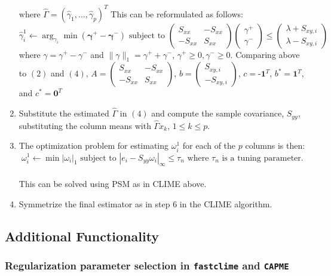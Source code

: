\documentclass{article}
\begin{document}
\begin{enumerate}
  $\text{where }\hat{\Gamma}=(\hat{\gamma}_1,...,\hat{\gamma}_p)^T$ This
  can be reformulated as follows:
  \[\hat{\gamma}_i^1\leftarrow\arg_{{\gamma}_i}\min (\mathbf{\gamma^{+}-\gamma^{-}}) \text{ subject to  } \left( \begin{array}{cc}
  S_{xx} & -S_{xx} \\
  -S_{xx} & S_{xx} \end{array} \right) 
  \left( \begin{array}{c}
  \gamma^+\\
  \gamma^-\end{array} \right)\le\left( \begin{array}{c}
  \lambda+S_{xy,i}\\
  \lambda-S_{xy,i}\end{array} \right)\] where
  $\gamma=\gamma^{+}-\gamma^-$ and $\|\gamma\|_1=\gamma^{+}+\gamma^-$,
  $\gamma^{+}\ge 0, \gamma^{-}\ge 0$. Comparing above to $(2)$ and $(4)$,
  $A = \left( \begin{array}{cc} S_{xx} & -S_{xx} \\ -S_{xx} & S_{xx} \end{array} \right)$,
  $b=\left( \begin{array}{c} S_{xy,i}\\ -S_{xy,i}\end{array} \right)$,
  $c=\textbf{-1}^T$, $b^{*}=\textbf{1}^T$, and $c^{*}=\textbf{0}^T$
\item
  Substitute the estimated $\hat{\Gamma}$ in $(4)$ and compute the
  sample covariance, $S_{yy}$, substituting the column means with
  $\hat{\Gamma} x_k$, $1\le k\le p$.
\item
  The optimization problem for estimating $\omega^1_i$ for each of the
  $p$ columns is then: \[
  \omega^1_i\leftarrow\min|\omega_i|_1\text{ subject to } |e_i - S_{yy}\omega_i|_\infty\le \tau_n\text{ where }\tau_n\text{ is a tuning parameter.}
  \]\\This can be solved using PSM as in CLIME above.
\item
  Symmetrize the final estimator as in step 6 in the CLIME algorithm.
\end{enumerate}

    \subsection{Additional Functionality}\label{additional-functionality}

    \subsubsection{Regularization parameter selection in \texttt{fastclime}
and
\texttt{CAPME}}\label{regularization-parameter-selection-in-fastclime-and-capme}
\end{document}
